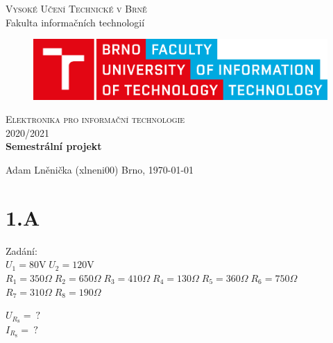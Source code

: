 \documentclass[12pt,a4paper]{article}
\begin{document}

	\begin{titlepage}
		\begin{center}
			\textsc{\LARGE Vysoké Učení Technické v Brně} \\[0.5cm]
			{\LARGE Fakulta informačních technologií}

			\begin{figure}[H]
				\center\includegraphics[width=0.5\linewidth]{obr/logo.pdf}
			\end{figure}

			\vspace{3cm}

			\textsc{\LARGE Elektronika pro informační technologie} \\[0.5cm]
			\textsc{\LARGE 2020/2021} \\[3.5cm]

			\textbf{{\LARGE Semestrální projekt}}
		\end{center}
		\vfill
		\begin{flushleft} 
			\large
			Adam Lněnička (xlneni00)
			\hfill
			Brno, \today
		\end{flushleft}
	\end{titlepage}


	\section*{1.A}

	{\Large Zadání:} \\
	$U_1 = 80 \text{V} \; U_2=120 \text{V}$ \\
	$R_1 = 350 \Omega \; R_2 = 650 \Omega \; R_3 = 410 \Omega \;
	R_4 = 130 \Omega \; R_5 = 360 \Omega \; R_6 =750 \Omega$ \\
	$R_7 = 310 \Omega \; R_8 = 190 \Omega$

	$U_{R_8} = \: \text{?}$ \\
	$I_{R_8} = \: \text{?}$ \\
\end{document}
